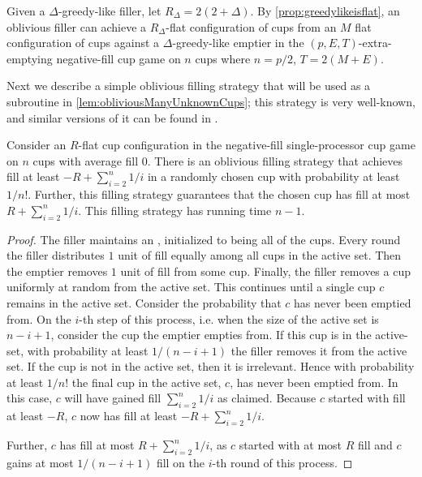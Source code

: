 Given a $\Delta$-greedy-like filler, let $R_\Delta = 2(2+\Delta).$
By \cref{prop:greedylikeisflat}, an oblivious filler can achieve
a $R_\Delta$-flat configuration of cups from an $M$ flat
configuration of cups against a $\Delta$-greedy-like emptier in
the $(p, E, T)$-extra-emptying negative-fill cup game on
$n$ cups where $n = p/2$, $T = 2(M + E)$.


Next we describe a simple oblivious filling strategy that will be used as a
subroutine in \cref{lem:obliviousManyUnknownCups}; this strategy is very
well-known, and similar versions of it can be found in
\cite{ mbe19, mbe15, die91, wku20}.
\begin{proposition}
  \label{prop:obliviousTerribleProbability}
  Consider an $R$-flat cup configuration in the negative-fill
  single-processor cup game on $n$ cups with average fill $0$.
  There is an oblivious filling strategy that
  achieves fill at least $-R + \sum_{i=2}^{n} 1/i$ in a randomly chosen
  cup with probability at least $1/n!$. Further, this filling strategy
  guarantees that the chosen cup has fill at most $R +
  \sum_{i=2}^{n} 1/i$. This filling strategy
  has running time $n-1$.
\end{proposition}
\begin{proof}
  The filler maintains an , initialized to being
  all of the cups. Every round the filler distributes $1$ unit of
  fill equally among all cups in the active set. Then the emptier
  removes $1$ unit of fill from some cup. Finally, the filler
  removes a cup uniformly at random from the active set. This
  continues until a single cup $c$ remains in the active set. 
  Consider the probability that $c$ has never been emptied
  from. On the $i$-th step of this process, i.e. when the size of
  the active set is $n-i+1$, consider the cup the emptier empties
  from. If this cup is in the active-set, with probability at
  least $1/(n-i+1)$ the filler removes it from the active set.
  If the cup is not in the active set, then it is irrelevant.
  Hence with probability at least $1/n!$ the final
  cup in the active set, $c$, has never been emptied from.
  In this case, $c$ will have gained fill $\sum_{i=2}^n 1/i$
  as claimed. Because $c$ started with fill at
  least $-R$, $c$ now has fill at least $-R+ \sum_{i=2}^n 1/i$. 

  Further, $c$ has fill at most $R + \sum_{i=2}^n 1/i$, as $c$
  started with at most $R$ fill and $c$ gains at most $1/(n-i+1)$ fill
  on the $i$-th round of this process.
\end{proof}

